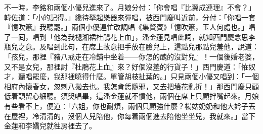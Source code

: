 不一時，李銘和兩個小優兒進來了。月娘分付：「你會唱『比翼成連理』不會？」韓佐道：「小的記得。」纔待拏起樂器來彈唱，被西門慶叫近前，分付：「你唱一套『憶吹簫』我聽罷。」兩個小優連忙改調唱《集賢賓》「憶吹簫，玉人何處也。」唱了一囘，唱到「他為我褪湘裙杜鵑花上血」，潘金蓮見唱此詞，就知西門慶念思李瓶兒之意。{}及唱到此句，在席上故意把手放在臉兒上，這點兒那點兒羞他，{}說道：「孩兒，那裡『豬八戒走在冷鋪中坐着——你怎的醜的沒對兒』！一個後婚老婆，又不是女兒，那裡討『杜鵑花上血』來？好個沒羞的行貨子！」西門慶道：「恠奴才，聽唱罷麼，我那裡曉得什麼。單管胡枝扯葉的。」只見兩個小優又唱到：「一個相府內懷春女，忽剌八拋去也。我怎肯恁隨邪，又去把墻花亂折！」那西門慶只顧低着頭留心細聽。{}須臾唱畢，這潘金蓮就不憤他，兩個在席上只顧拌嘴起來。月娘有些看不上，便道：「六姐，你也耐煩，兩個只顧強什麼？楊姑奶奶和他大妗子丟在屋裡，冷清清的，沒個人兒陪他，你每着兩個進去陪他坐坐兒，我就來。」當下金蓮和李嬌兒就徃房裡去了。

